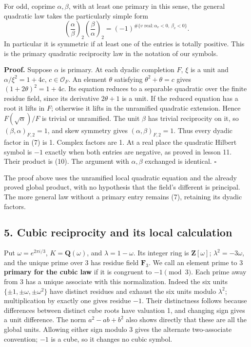 \documentclass[11pt,a4paper]{article}
\begin{document}
For odd, coprime \(\alpha,\beta\), with at least one primary in this
sense, the general quadratic law takes the particularly simple form \[
\left(\frac\alpha\beta\right)_2
\left(\frac\beta\alpha\right)_2
=(-1)^{\#\{v\text{ real}:\alpha_v<0,\ \beta_v<0\}}.
\tag{10}
\] In particular it is symmetric if at least one of the entries is
totally positive. This is the primary quadratic reciprocity law in the
notation of our symbols.

\textbf{Proof.} Suppose \(\alpha\) is primary. At each dyadic completion
\(F\), \(\xi\) is a unit and \(\alpha/\xi^2=1+4c\),
\(c\in\mathcal O_F\). An element \(\theta\) satisfying
\(\theta^2+\theta=c\) gives \((1+2\theta)^2=1+4c\). Its equation reduces
to a separable quadratic over the finite residue field, since its
derivative \(2\theta+1\) is a unit. If the reduced equation has a root
it lifts in \(F\); otherwise it lifts in the unramified quadratic
extension. Hence \(F(\sqrt\alpha)/F\) is trivial or unramified. The unit
\(\beta\) has trivial reciprocity on it, so \((\beta,\alpha)_{F,2}=1\),
and skew symmetry gives \((\alpha,\beta)_{F,2}=1\). Thus every dyadic
factor in (7) is 1. Complex factors are 1. At a real place the quadratic
Hilbert symbol is \(-1\) exactly when both entries are negative, as
proved in lesson 11. Their product is (10). The argument with
\(\alpha,\beta\) exchanged is identical. \(\square\)

The proof above uses the unramified local quadratic equation and the
already proved global product, with no hypothesis that the field's
different is principal. The more general law without a primary entry
remains (7), retaining its dyadic factors.

\subsection{5. Cubic reciprocity and its local
calculation}\label{cubic-reciprocity-and-its-local-calculation}

Put \(\omega=e^{2\pi i/3}\), \(K=\mathbf Q(\omega)\), and
\(\lambda=1-\omega\). Its integer ring is \(\mathbf Z[\omega]\);
\(\lambda^2=-3\omega\), and the unique prime over 3 has residue field
\(\mathbf F_3\). We call an element prime to 3 \textbf{primary for the
cubic law} if it is congruent to \(-1\pmod3\). Each prime away from 3
has a unique associate with this normalization. Indeed the six units
\(\{\pm1,\pm\omega,\pm\omega^2\}\) have distinct residues and exhaust
the six units modulo \(\lambda^2\); multiplication by exactly one gives
residue \(-1\). Their distinctness follows because differences between
distinct cube roots have valuation 1, and changing sign gives a unit
difference. The norm \(a^2-ab+b^2\) also shows directly that these are
all the global units. Allowing either sign modulo 3 gives the alternate
two-associate convention; \(-1\) is a cube, so it changes no cubic
symbol.
\end{document}
